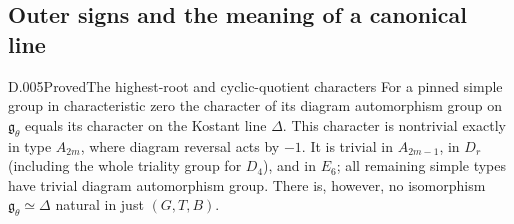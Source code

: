 \subsection{Outer signs and the meaning of a canonical line}
\begin{saresult}{D.005}{Proved}{The highest-root and cyclic-quotient characters}
For a pinned simple group in characteristic zero the character of its
diagram automorphism group on $\mathfrak g_\theta$ equals its character
on the Kostant line $\Delta$.  This character is nontrivial exactly in
type $A_{2m}$, where diagram reversal acts by $-1$.  It is trivial in
$A_{2m-1}$, in $D_r$ (including the whole triality group for $D_4$),
and in $E_6$; all remaining simple types have trivial diagram
automorphism group.
There is, however, no isomorphism
$\mathfrak g_\theta\simeq\Delta$ natural in just $(G,T,B)$.
\end{saresult}
